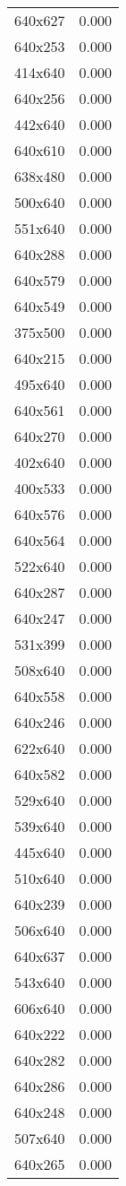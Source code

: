 \begin{table}
\begin{tabular}{lr}
640x627 & 0.000 \\
640x253 & 0.000 \\
414x640 & 0.000 \\
640x256 & 0.000 \\
442x640 & 0.000 \\
640x610 & 0.000 \\
638x480 & 0.000 \\
500x640 & 0.000 \\
551x640 & 0.000 \\
640x288 & 0.000 \\
640x579 & 0.000 \\
640x549 & 0.000 \\
375x500 & 0.000 \\
640x215 & 0.000 \\
495x640 & 0.000 \\
640x561 & 0.000 \\
640x270 & 0.000 \\
402x640 & 0.000 \\
400x533 & 0.000 \\
640x576 & 0.000 \\
640x564 & 0.000 \\
522x640 & 0.000 \\
640x287 & 0.000 \\
640x247 & 0.000 \\
531x399 & 0.000 \\
508x640 & 0.000 \\
640x558 & 0.000 \\
640x246 & 0.000 \\
622x640 & 0.000 \\
640x582 & 0.000 \\
529x640 & 0.000 \\
539x640 & 0.000 \\
445x640 & 0.000 \\
510x640 & 0.000 \\
640x239 & 0.000 \\
506x640 & 0.000 \\
640x637 & 0.000 \\
543x640 & 0.000 \\
606x640 & 0.000 \\
640x222 & 0.000 \\
640x282 & 0.000 \\
640x286 & 0.000 \\
640x248 & 0.000 \\
507x640 & 0.000 \\
640x265 & 0.000 \\

\end{tabular}
\end{table}
